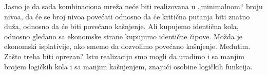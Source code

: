 \begin{frame}[label=02-s029]
\gusttekst
Jasno je da sada kombinaciona mreža neće biti realizovana u „minimalnom“ broju nivoa, da će se broj nivoa povećati odnosno da će kritična putanja biti znatno duža, odnosno da će biti povećano kašnjenje. Ali kupujemo identična kola, odnosno gledano sa ekonomske strane kupujumo identične čipove. Možda je ekonomski isplativije, ako smemo da dozvolimo povećano kašnjenje. Međutim. Zašto treba biti oprezan? Istu realizaciju smo mogli da uradimo i sa manjim brojem logičkih kola i sa manjim kašnjenjem, znajući osobine logičkih funkcija.

\vspace{3mm}\centering
\begingroup{}\def\DEodnos{=}

\endgroup
\end{frame}
